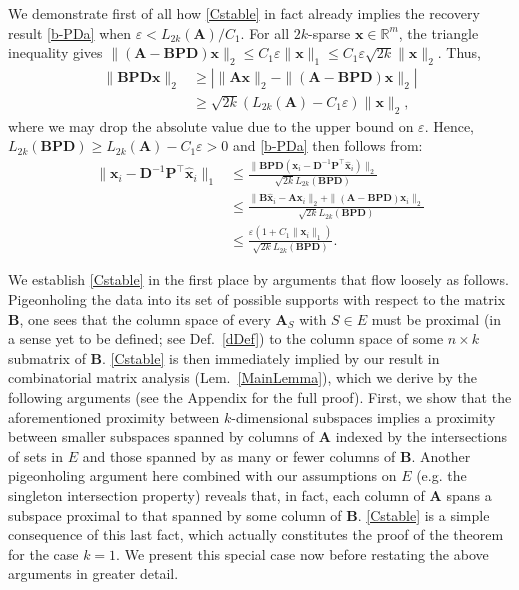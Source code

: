 \documentclass[9pt,twocolumn]{pnas-new}
\begin{document}

We demonstrate first of all how \eqref{Cstable} in fact already implies the recovery result \eqref{b-PDa} when $\varepsilon < L_{2k}(\mathbf{A}) / C_1$. For all $2k$-sparse $\mathbf{x} \in \mathbb{R}^m$, the triangle inequality gives \mbox{$\|(\mathbf{A}-\mathbf{BPD})\mathbf{x}\|_2  \leq C_1\varepsilon \|\mathbf{x}\|_1 \leq C_1 \varepsilon \sqrt{2k}  \|\mathbf{x}\|_2$}. Thus, 
\begin{align*}
\|\mathbf{BPD}\mathbf{x}\|_2 
&\geq | \|\mathbf{A}\mathbf{x}\|_2 - \|(\mathbf{A}-\mathbf{BPD})\mathbf{x}\|_2 | \\
&\geq \sqrt{2k} (L_{2k}(\mathbf{A}) -  C_1\varepsilon) \|\mathbf{x}\|_2,
\end{align*}
%
where we may drop the absolute value due to the upper bound on $\varepsilon$. Hence, $L_{2k}(\mathbf{BPD}) \geq L_{2k}(\mathbf{A}) - C_1\varepsilon  > 0$ and \eqref{b-PDa} then follows from:
\begin{align*}
\|\mathbf{x}_i - \mathbf{D}^{-1}\mathbf{P}^{\top}\mathbf{\hat x}_i \|_1
&\leq \frac{\|\mathbf{BPD}(\mathbf{x}_i - \mathbf{D}^{-1}\mathbf{P}^{\top}\mathbf{\hat x}_i)\|_2}{\sqrt{2k}L_{2k}(\mathbf{BPD})} \\
&\leq \frac{\|\mathbf{B}\mathbf{\hat x}_i - \mathbf{A}\mathbf{x}_i\|_2 + \|(\mathbf{A} - \mathbf{BPD})\mathbf{x}_i\|_2}{\sqrt{2k}L_{2k}(\mathbf{BPD})} \\
&\leq \frac{\varepsilon (1+C_1 \|\mathbf{x}_i\|_1)}{\sqrt{2k}L_{2k}(\mathbf{BPD})}.
\end{align*}

We establish \eqref{Cstable} in the first place by arguments that flow loosely as follows. Pigeonholing the data into its set of possible supports with respect to the matrix $\mathbf{B}$, one sees that the column space of every $\mathbf{A}_S$ with $S \in E$ must be proximal (in a sense yet to be defined; see Def.~\ref{dDef}) to the column space of some $n \times k$ submatrix of $\mathbf{B}$. \eqref{Cstable} is then immediately implied by our result in combinatorial matrix analysis (Lem.~\ref{MainLemma}), which we derive by the following arguments (see the Appendix for the full proof). First, we show that the aforementioned proximity between $k$-dimensional subspaces implies a proximity between smaller subspaces spanned by columns of $\mathbf{A}$ indexed by the intersections of sets in $E$ and those spanned by as many or fewer columns of $\mathbf{B}$. Another pigeonholing argument here combined with our assumptions on $E$ (e.g. the singleton intersection property) reveals that, in fact, each column of $\mathbf{A}$ spans a subspace proximal to that spanned by some column of $\mathbf{B}$. \eqref{Cstable} is a simple consequence of this last fact, which actually constitutes the proof of the theorem for the case $k=1$. We present this special case now before restating the above arguments in greater detail.
\end{document}
